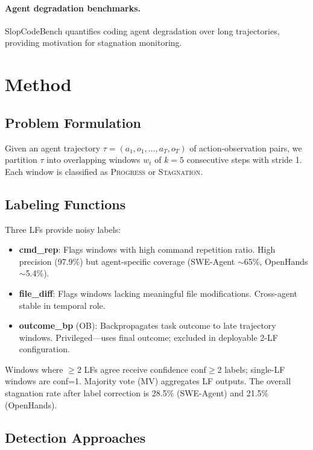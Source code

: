 \documentclass[11pt,a4paper]{article}
\begin{document}
\paragraph{Agent degradation benchmarks.}
SlopCodeBench \cite{slopcodebench2026} quantifies coding agent degradation over long trajectories, providing motivation for stagnation monitoring.

\section{Method}

\subsection{Problem Formulation}

Given an agent trajectory $\tau = (a_1, o_1, \ldots, a_T, o_T)$ of action-observation pairs, we partition $\tau$ into overlapping windows $w_t$ of $k=5$ consecutive steps with stride 1.
Each window is classified as \textsc{Progress} or \textsc{Stagnation}.

\subsection{Labeling Functions}

Three LFs provide noisy labels:

\begin{itemize}
    \item \textbf{cmd\_rep}: Flags windows with high command repetition ratio. High precision (97.9\%) but agent-specific coverage (SWE-Agent $\sim$65\%, OpenHands $\sim$5.4\%).
    \item \textbf{file\_diff}: Flags windows lacking meaningful file modifications. Cross-agent stable in temporal role.
    \item \textbf{outcome\_bp} (OB): Backpropagates task outcome to late trajectory windows. Privileged---uses final outcome; excluded in deployable 2-LF configuration.
\end{itemize}

Windows where $\geq$2 LFs agree receive confidence conf$\geq$2 labels; single-LF windows are conf=1.
Majority vote (MV) aggregates LF outputs.
The overall stagnation rate after label correction is 28.5\% (SWE-Agent) and 21.5\% (OpenHands).

\subsection{Detection Approaches}
\end{document}
